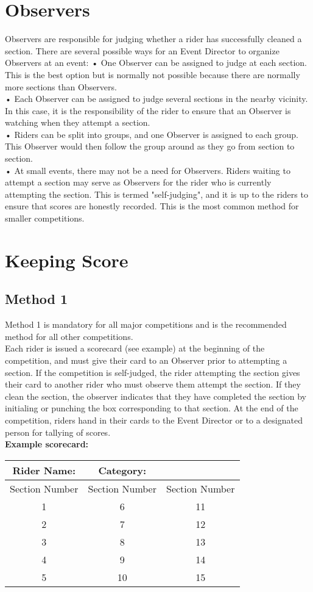 \section{Observers}
Observers are responsible for judging whether a rider has successfully cleaned a section. There are several possible ways
for an Event Director to organize Observers at an event:
• One Observer can be assigned to judge at each section. This is the best option but is normally not possible because
there are normally more sections than Observers.\\
• Each Observer can be assigned to judge several sections in the nearby vicinity. In this case, it is the responsibility of
the rider to ensure that an Observer is watching when they attempt a section.\\
• Riders can be split into groups, and one Observer is assigned to each group. This Observer would then follow the
group around as they go from section to section.\\
• At small events, there may not be a need for Observers. Riders waiting to attempt a section may serve as Observers
for the rider who is currently attempting the section. This is termed "self-judging", and it is up to the riders to ensure
that scores are honestly recorded. This is the most common method for smaller competitions.
\section{Keeping Score}
\subsection{Method 1}
Method 1 is mandatory for all major competitions and is the recommended method for all other competitions.\\
Each rider is issued a scorecard (see example) at the beginning of the competition, and must give their card to an
Observer prior to attempting a section. If the competition is self-judged, the rider attempting the section gives their card
to another rider who must observe them attempt the section. If they clean the section, the observer indicates that they
have completed the section by initialing or punching the box corresponding to that section. At the end of the
competition, riders hand in their cards to the Event Director or to a designated person for tallying of scores.\\
\textbf{Example scorecard:}\\\begin{tabular}{|c|c|c|}
\hline 
\textbf{Rider Name:} & \textbf{Category:} &  \\ 
\hline 
Section Number  & Section Number  & Section Number \\ 
\hline 
1 & 6 & 11 \\ 
\hline 
2 & 7 & 12 \\ 
\hline 
3 & 8 & 13 \\ 
\hline 
4 & 9 & 14 \\ 
\hline 
5 & 10 & 15 \\ 
\hline 
\end{tabular}

